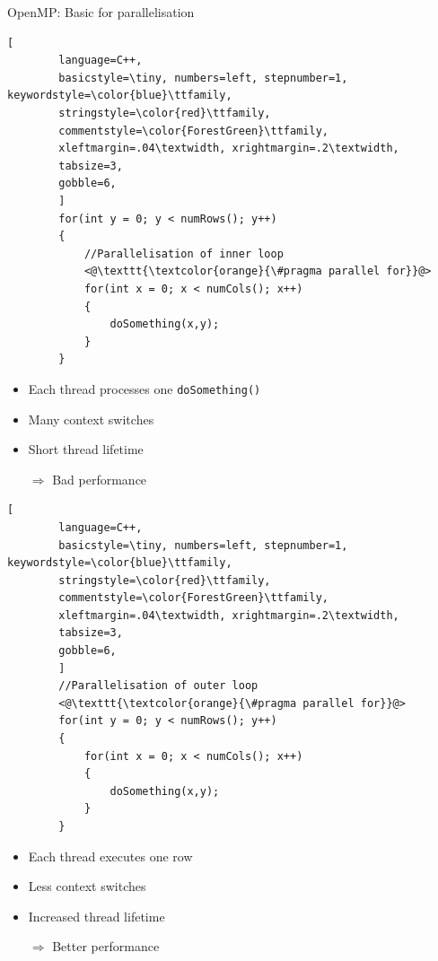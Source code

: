 \documentclass[shortpres,usenames,dvipsnames]{beamer}
\begin{document}
\begin{frame}[containsverbatim]{OpenMP: Basic for parallelisation}
	\begin{multicols}{2}
		\begin{lstlisting}[
		language=C++,
		basicstyle=\tiny, numbers=left, stepnumber=1, keywordstyle=\color{blue}\ttfamily,
		stringstyle=\color{red}\ttfamily,
		commentstyle=\color{ForestGreen}\ttfamily,
		xleftmargin=.04\textwidth, xrightmargin=.2\textwidth,
		tabsize=3,
		gobble=6,
		]
		for(int y = 0; y < numRows(); y++)
		{
			//Parallelisation of inner loop
			<@\texttt{\textcolor{orange}{\#pragma parallel for}}@>
			for(int x = 0; x < numCols(); x++)
			{
				doSomething(x,y);
			}
		}
		\end{lstlisting}
		
		\begin{itemize}
			\item Each thread processes one \verb|doSomething()|
			\item Many context switches
			\item Short thread lifetime
			\item[$\Rightarrow$] Bad performance 
		\end{itemize}
		
		\columnbreak
		
		\begin{lstlisting}[
		language=C++,
		basicstyle=\tiny, numbers=left, stepnumber=1, keywordstyle=\color{blue}\ttfamily,
		stringstyle=\color{red}\ttfamily,
		commentstyle=\color{ForestGreen}\ttfamily,
		xleftmargin=.04\textwidth, xrightmargin=.2\textwidth,
		tabsize=3,
		gobble=6,
		]
		//Parallelisation of outer loop
		<@\texttt{\textcolor{orange}{\#pragma parallel for}}@>
		for(int y = 0; y < numRows(); y++)
		{
			for(int x = 0; x < numCols(); x++)
			{
				doSomething(x,y);
			}
		}
		\end{lstlisting}
		
		\begin{itemize}
			\item Each thread executes one row
			\item Less context switches
			\item Increased thread lifetime
			\item[$\Rightarrow$] Better performance
		\end{itemize}
	\end{multicols}
\end{frame}
\end{document}
